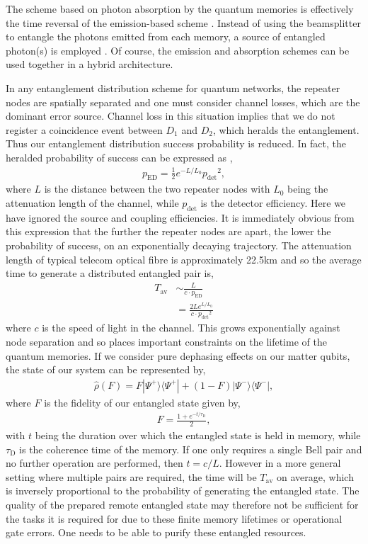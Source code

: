 The scheme based on photon absorption by the quantum memories is effectively the time reversal of the emission-based scheme \cite{}. Instead of using the beamsplitter to entangle the photons emitted from each memory, a source of entangled photon(s) is employed \cite{}. Of course, the emission and absorption schemes can be used together in a hybrid architecture.

In any entanglement distribution scheme for quantum networks, the repeater nodes are spatially separated and one must consider channel losses, which are the dominant error source. Channel loss in this situation implies that we do not register a coincidence event between $D_1$ and $D_2$, which heralds the entanglement. Thus our entanglement distribution success probability is reduced. In fact, the heralded probability of success can be expressed as \cite{},
\begin{align}
p_\mathrm{ED}= \frac{1}{2} e^{-L/L_0} {p_\mathrm{det}}^2,
\end{align} 
where $L$ is the distance between the two repeater nodes with $L_0$ being the attenuation length of the channel, while $p_\mathrm{det}$ is the detector efficiency. Here we have ignored the source and coupling efficiencies. It is immediately obvious from this expression that the further the repeater nodes are apart, the lower the probability of success, on an exponentially decaying trajectory. The attenuation length of typical telecom optical fibre is approximately 22.5km and so the average time to generate a distributed entangled pair is,
\begin{align}
T_\mathrm{av} &\sim \frac{L}{ c \cdot p_\mathrm{ED}}\nonumber\\
&= \frac{2 L e^{L/L_0}}{ c \cdot {p_\mathrm{det}}^2}
\end{align} 
where $c$ is the speed of light in the channel. This grows exponentially against node separation and so places important constraints on the lifetime of the quantum memories. If we consider pure dephasing effects on our matter qubits, the state of our system can be represented by,
\begin{align}
\hat\rho(F) = F |\Psi^+\rangle \langle \Psi^+|+(1-F) |\Psi^-\rangle \langle \Psi^-|,
\label{eq:rho_bell_fid}
\end{align} 
where $F$ is the fidelity of our entangled state given by,
\begin{align}
F=\frac{1+e^{-t/\tau_\mathrm{D}}}{2},
\end{align} 
with $t$ being the duration over which the entangled state is held in memory, while $\tau_\mathrm{D}$ is the coherence time of the memory. If one only requires a single Bell pair and no further operation are performed, then \mbox{$t=c/L$}. However in a more general setting where multiple pairs are required, the time will be $T_\mathrm{av}$ on average, which is inversely proportional to the probability of generating the entangled state. The quality of the prepared remote entangled state may therefore not be sufficient for the tasks it is required for due to these finite memory lifetimes or operational gate errors. One needs to be able to purify these entangled resources. 

